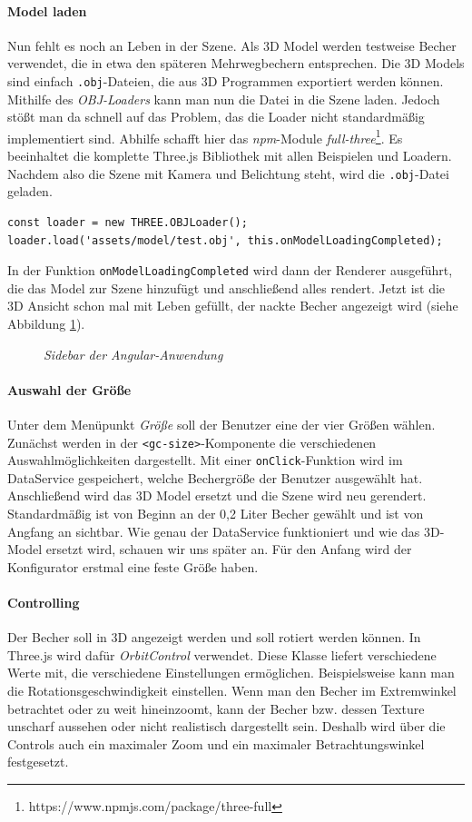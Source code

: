 \paragraph{Model laden} Nun fehlt es noch an Leben in der Szene. Als 3D Model werden testweise Becher verwendet, die in etwa den späteren Mehrwegbechern entsprechen. Die 3D Models sind einfach \texttt{.obj}-Dateien, die aus 3D Programmen exportiert werden können. Mithilfe des \textit{OBJ-Loaders} kann man nun die Datei in die Szene laden. Jedoch stößt man da schnell auf das Problem, das die Loader nicht standardmäßig implementiert sind. Abhilfe schafft hier das \textit{npm}-Module \textit{full-three}\footnote{https://www.npmjs.com/package/three-full}. Es beeinhaltet die komplette Three.js Bibliothek mit allen Beispielen und Loadern. Nachdem also die Szene mit Kamera und Belichtung steht, wird die \texttt{.obj}-Datei geladen.
%
\begin{lstlisting}
const loader = new THREE.OBJLoader();
loader.load('assets/model/test.obj', this.onModelLoadingCompleted);
\end{lstlisting}
%
In der Funktion \texttt{onModelLoadingCompleted} wird dann der Renderer ausgeführt, die das Model zur Szene hinzufügt und anschließend alles rendert. Jetzt ist die 3D Ansicht schon mal mit Leben gefüllt, der nackte Becher angezeigt wird (siehe Abbildung \ref{fig:3dmodel}).
\begin{figure}[h]
	\centering
	{}
	\caption[Komponentendiagramm]{\textit{Sidebar der Angular-Anwendung}}
	\label{fig:3dmodel}
\end{figure}
\paragraph{Auswahl der Größe}
Unter dem Menüpunkt \textit{\glqq Größe\grqq} soll der Benutzer eine der vier Größen wählen. Zunächst werden in der \texttt{<gc-size>}-Komponente die verschiedenen Auswahlmöglichkeiten dargestellt. Mit einer \texttt{onClick}-Funktion wird im DataService gespeichert, welche Bechergröße der Benutzer ausgewählt hat. Anschließend wird das 3D Model ersetzt und die Szene wird neu gerendert. Standardmäßig ist von Beginn an der 0,2 Liter Becher gewählt und ist von Angfang an sichtbar. Wie genau der DataService funktioniert und wie das 3D-Model ersetzt wird, schauen wir uns später an. Für den Anfang wird der Konfigurator erstmal eine feste Größe haben.
\paragraph{Controlling}
Der Becher soll in 3D angezeigt werden und soll rotiert werden können. In Three.js wird dafür \textit{OrbitControl} verwendet. Diese Klasse liefert verschiedene Werte mit, die verschiedene Einstellungen ermöglichen. Beispielsweise kann man die Rotationsgeschwindigkeit einstellen. Wenn man den Becher im Extremwinkel betrachtet oder zu weit hineinzoomt, kann der Becher bzw. dessen Texture unscharf aussehen oder nicht realistisch dargestellt sein. Deshalb wird über die Controls auch ein maximaler Zoom und ein maximaler Betrachtungswinkel festgesetzt.
